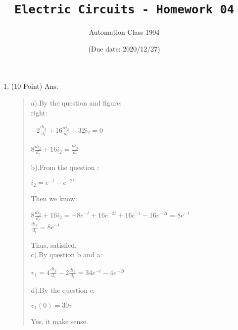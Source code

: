 \documentclass[12pt,a4paper]{article}
\title{\textbf{\texttt{Electric Circuits - Homework 04}}}
\author{Automation Class 1904}
\date{(Due date: 2020/12/27)}%
\begin{document}
	\maketitle
	
	\begin{enumerate}	
		\item (10 Point)
			Ans:
		\begin{quote}
			a).By the question and figure:
			\\right:
			\begin{center}
				$-2\frac{di_g}{d_t} + 16\frac{di_2}{d_t}+32i_2 = 0$
			\end{center}
			\begin{center}
				$8\frac{di_2}{d_t} + 16i_2 = \frac{di_g}{d_t}$
			\end{center}
			b).From the question :
			\begin{center}
				$i_2=e^{-t}-e^{-2t}$
			\end{center}
			Then we know:
			\begin{center}
				$8\frac{di_2}{d_t} + 16i_2=-8e^{-t}+16e^{-2t}+16e^{-t}-16e^{-2t} = 8e^{-t}$
				\\$\frac{di_g}{d_t} = 8e^{-t}$
			\end{center}
			Thus, satisfied.\\
			c).By question b and a:
			\begin{center}
				$v_1 = 4\frac{di_g}{d_t}-2\frac{di_2}{d_t} = 34e^{-t}-4e^{-2t}$
			\end{center}
			d).By the question c:
			\begin{center}
				$v_1{(0)} = 30v$
			\end{center}
			Yes, it make sense.
		\end{quote}
		\clearpage %
		

\end{enumerate}
\end{document}
